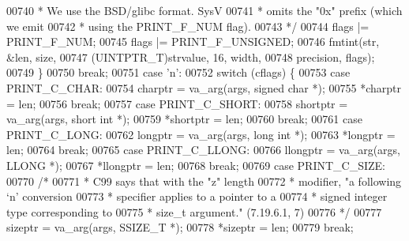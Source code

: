 \begin{DoxyCode}
{{{{00740 \textcolor{comment}{                     * We use the BSD/glibc format.  SysV}
00741 \textcolor{comment}{                     * omits the "0x" prefix (which we emit}
00742 \textcolor{comment}{                     * using the PRINT\_F\_NUM flag).}
00743 \textcolor{comment}{                     */}
00744                     flags |= PRINT\_F\_NUM;
00745                     flags |= PRINT\_F\_UNSIGNED;
00746                     fmtint(str, &len, size,
00747                         (UINTPTR\_T)strvalue, 16, width,
00748                         precision, flags);
00749                 \}
00750                 \textcolor{keywordflow}{break};
00751             \textcolor{keywordflow}{case} \textcolor{charliteral}{'n'}:
00752                 \textcolor{keywordflow}{switch} (cflags) \{
00753                 \textcolor{keywordflow}{case} PRINT\_C\_CHAR:
00754                     charptr = va\_arg(args, \textcolor{keywordtype}{signed} \textcolor{keywordtype}{char} *);
00755                     *charptr = len;
00756                     \textcolor{keywordflow}{break};
00757                 \textcolor{keywordflow}{case} PRINT\_C\_SHORT:
00758                     shortptr = va\_arg(args, \textcolor{keywordtype}{short} \textcolor{keywordtype}{int} *);
00759                     *shortptr = len;
00760                     \textcolor{keywordflow}{break};
00761                 \textcolor{keywordflow}{case} PRINT\_C\_LONG:
00762                     longptr = va\_arg(args, \textcolor{keywordtype}{long} \textcolor{keywordtype}{int} *);
00763                     *longptr = len;
00764                     \textcolor{keywordflow}{break};
00765                 \textcolor{keywordflow}{case} PRINT\_C\_LLONG:
00766                     llongptr = va\_arg(args, LLONG *);
00767                     *llongptr = len;
00768                     \textcolor{keywordflow}{break};
00769                 \textcolor{keywordflow}{case} PRINT\_C\_SIZE:
00770                     \textcolor{comment}{/*}
00771 \textcolor{comment}{                     * C99 says that with the "z" length}
00772 \textcolor{comment}{                     * modifier, "a following `n' conversion}
00773 \textcolor{comment}{                     * specifier applies to a pointer to a}
00774 \textcolor{comment}{                     * signed integer type corresponding to}
00775 \textcolor{comment}{                     * size\_t argument." (7.19.6.1, 7)}
00776 \textcolor{comment}{                     */}
00777                     sizeptr = va\_arg(args, SSIZE\_T *);
00778                     *sizeptr = len;
00779                     \textcolor{keywordflow}{break};
}}}}
\end{DoxyCode}
